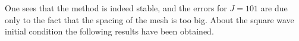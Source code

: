 \documentclass[11pt,a4paper]{article}
\begin{document}
\begin{figure}[!h]
\end{figure}
One sees that the method is indeed stable, and the errors for $J=101$ are due only to the fact that the spacing of the mesh is too big. %
About the square wave initial condition the following results have been obtained. 
\end{document}

